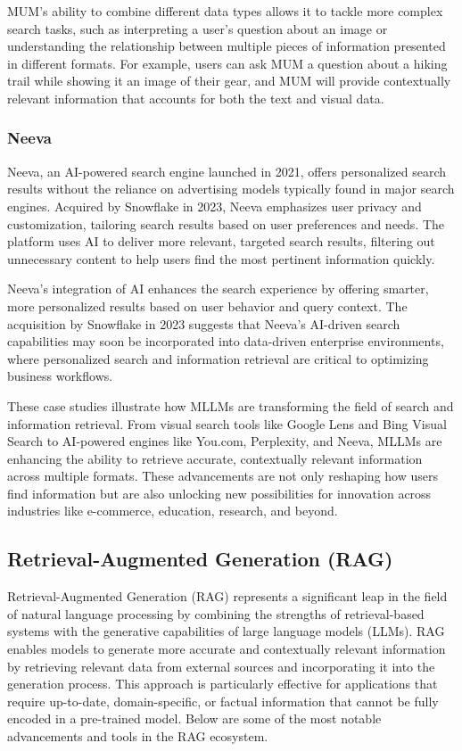 MUM’s ability to combine different data types allows it to tackle more complex search tasks, such as interpreting a user’s question about an image or understanding the relationship between multiple pieces of information presented in different formats. 
For example, users can ask MUM a question about a hiking trail while showing it an image of their gear, and MUM will provide contextually relevant information that accounts for both the text and visual data.

\subsubsection{Neeva}

Neeva, an AI-powered search engine launched in 2021, offers personalized search results without the reliance on advertising models typically found in major search engines. 
Acquired by Snowflake in 2023, Neeva emphasizes user privacy and customization, tailoring search results based on user preferences and needs. 
The platform uses AI to deliver more relevant, targeted search results, filtering out unnecessary content to help users find the most pertinent information quickly.

Neeva's integration of AI enhances the search experience by offering smarter, more personalized results based on user behavior and query context. 
The acquisition by Snowflake in 2023 suggests that Neeva's AI-driven search capabilities may soon be incorporated into data-driven enterprise environments, where personalized search and information retrieval are critical to optimizing business workflows.

These case studies illustrate how MLLMs are transforming the field of search and information retrieval. 
From visual search tools like Google Lens and Bing Visual Search to AI-powered engines like You.com, Perplexity, and Neeva, MLLMs are enhancing the ability to retrieve accurate, contextually relevant information across multiple formats. 
These advancements are not only reshaping how users find information but are also unlocking new possibilities for innovation across industries like e-commerce, education, research, and beyond.

\subsection{Retrieval-Augmented Generation (RAG)}

Retrieval-Augmented Generation (RAG) represents a significant leap in the field of natural language processing by combining the strengths of retrieval-based systems with the generative capabilities of large language models (LLMs). 
RAG enables models to generate more accurate and contextually relevant information by retrieving relevant data from external sources and incorporating it into the generation process. 
This approach is particularly effective for applications that require up-to-date, domain-specific, or factual information that cannot be fully encoded in a pre-trained model. 
Below are some of the most notable advancements and tools in the RAG ecosystem.

